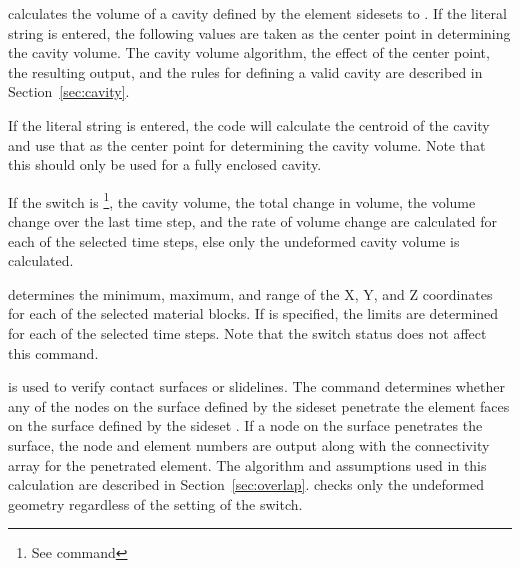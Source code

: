  {
 calculates the volume of a cavity defined by the element
sidesets  to .  If the literal string
 is entered, the following values are taken as the
center point in determining the cavity volume. The cavity volume
algorithm, the effect of the center point, the resulting output, and the
rules for defining a valid cavity are described in
Section~\ref{sec:cavity}.

If the literal string  is entered, the code will
calculate the centroid of the cavity and use that as the center point
for determining the cavity volume. Note that this should only be used
for a fully enclosed cavity.

If the  switch is \footnote{See command
}, the cavity volume, the total change in volume, the volume
change over the last time step, and the rate of volume change are
calculated for each of the selected time steps, else only the undeformed
cavity volume is calculated.
}

 {
 determines the minimum, maximum, and range of the
X, Y, and Z coordinates for each of the selected material blocks.
If  is specified, the limits are determined for each of
the selected time steps.  Note that the  switch status does
not affect this command.
}

 {
 is used to verify contact surfaces or slidelines.  The
command determines whether any of the nodes on the surface defined by
the sideset  penetrate the element faces on the surface
defined by the sideset .  If a node on the
 surface penetrates the  surface, the
node and element numbers are output along with the connectivity array
for the penetrated element. The algorithm and assumptions used in this
calculation are described in Section~\ref{sec:overlap}.  
checks only the undeformed geometry regardless of the setting of the
 switch.
}

